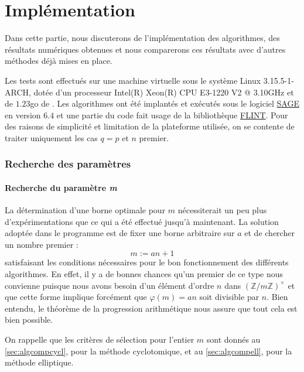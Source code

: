 \documentclass[a4paper]{article} %
\numberwithin{section}{part}
\numberwithin{equation}{section}
\newcommand\zmodninv[1]{(\mathbb{Z}/#1\mathbb{Z})^{\times}}
\begin{document}
\part{Implémentation}
\label{trois}
Dans cette partie, nous discuterons de l'implémentation des algorithmes, des
résultats numériques obtenues et nous comparerons ces résultats avec d'autres
méthodes déjà mises en place.\par
Les tests sont effectués sur une machine virtuelle sous le système Linux 
3.15.5-1-ARCH, dotée d'un processeur Intel(R) Xeon(R) CPU E3-1220 V2 @ 3.10GHz 
et de $1.23$go de . Les algorithmes ont été implantés et 
exécutés sous le logiciel \href{http://www.sagemath.org/}{SAGE} en version 
$6.4$ et une partie du code fait usage de la bibliothèque 
\href{http://www.flintlib.org/}{FLINT}. Pour des raisons de simplicité et
limitation de la plateforme utilisée, on se contente de traiter uniquement les 
cas $q = p$ et $n$ premier.
\section{Recherche des paramètres}

\subsection{Recherche du paramètre \emph{m}}
La détermination d'une borne optimale pour $m$ nécessiterait un peu plus
d'expérimentations que ce qui a été effectué jusqu'à maintenant. La solution 
adoptée dans le programme est de fixer une borne arbitraire sur $a$ et de 
chercher un nombre premier :
\begin{equation}
\label{eq:formedem}
m := an + 1 
\end{equation}
satisfaisant les conditions nécessaires pour le bon fonctionnement
des différents algorithmes. En effet, il y a de bonnes chances qu'un premier de 
ce type nous convienne puisque nous avons besoin d'un élément d'ordre $n$ dans
$\zmodninv{m}$ et que cette forme implique forcément que $\varphi(m) = 
an$ soit divisible par $n$. Bien entendu, le théorème de la progression
arithmétique nous assure que tout cela est bien possible.\par
On rappelle que les critères de sélection pour l'entier $m$ sont donnés au 
\ref{sec:algcompcycl}, pour la méthode cyclotomique, et au \ref{sec:algcompell},
pour la méthode elliptique.
\end{document}
